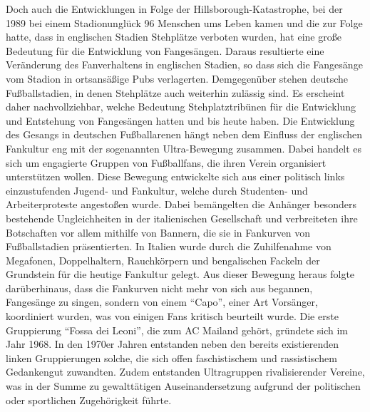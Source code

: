 Doch auch die Entwicklungen in Folge der Hillsborough-Katastrophe, bei der 1989 bei einem Stadionunglück 96 Menschen ums Leben kamen und die zur Folge hatte, dass in englischen Stadien Stehplätze verboten wurden, hat eine große Bedeutung für die Entwicklung von Fangesängen.
Daraus resultierte eine Veränderung des Fanverhaltens in englischen Stadien, so dass sich die Fangesänge vom Stadion in ortsansäßige Pubs verlagerten.
Demgegenüber stehen deutsche Fußballstadien, in denen Stehplätze auch weiterhin zulässig sind.
Es erscheint daher nachvollziehbar, welche Bedeutung Stehplatztribünen für die Entwicklung und Entstehung von Fangesängen hatten und bis heute haben.
Die Entwicklung des Gesangs in deutschen Fußballarenen hängt neben dem Einfluss der englischen Fankultur eng mit der sogenannten Ultra-Bewegung zusammen.
Dabei handelt es sich um engagierte Gruppen von Fußballfans, die ihren Verein organisiert unterstützen wollen.
Diese Bewegung entwickelte sich aus einer politisch links einzustufenden Jugend- und Fankultur, welche durch Studenten- und Arbeiterproteste angestoßen wurde.
Dabei bemängelten die Anhänger besonders bestehende Ungleichheiten in der italienischen Gesellschaft und verbreiteten ihre Botschaften vor allem mithilfe von Bannern, die sie in Fankurven von Fußballstadien präsentierten.
In Italien wurde durch die Zuhilfenahme von Megafonen, Doppelhaltern, Rauchkörpern und bengalischen Fackeln der Grundstein für die heutige Fankultur gelegt.
Aus dieser Bewegung heraus folgte darüberhinaus, dass die Fankurven nicht mehr von sich aus begannen, Fangesänge zu singen, sondern von einem "`Capo"', einer Art Vorsänger, koordiniert wurden, was von einigen Fans kritisch beurteilt wurde.
Die erste Gruppierung "`Fossa dei Leoni"', die zum AC Mailand gehört, gründete sich im Jahr 1968.
In den 1970er Jahren entstanden neben den bereits existierenden linken Gruppierungen solche, die sich offen faschistischem und rassistischem Gedankengut zuwandten.
Zudem entstanden Ultragruppen rivalisierender Vereine, was in der Summe zu gewalttätigen Auseinandersetzung aufgrund der politischen oder sportlichen Zugehörigkeit führte.

